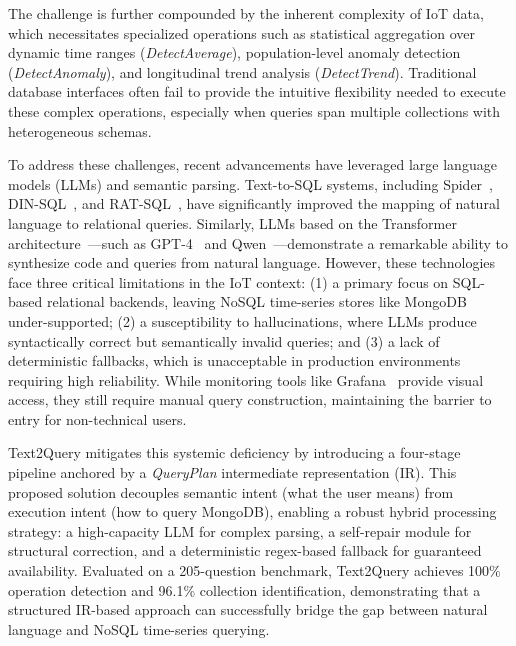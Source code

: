 \documentclass[preprint,12pt,a4paper]{elsarticle}
\begin{document}
The challenge is further compounded by the inherent complexity of IoT data, which necessitates specialized operations such as statistical aggregation over dynamic time ranges (\emph{DetectAverage}), population-level anomaly detection (\emph{DetectAnomaly}), and longitudinal trend analysis (\emph{DetectTrend}). Traditional database interfaces often fail to provide the intuitive flexibility needed to execute these complex operations, especially when queries span multiple collections with heterogeneous schemas.

To address these challenges, recent advancements have leveraged large language models (LLMs) and semantic parsing. Text-to-SQL systems, including Spider~\cite{yu2018spider}, DIN-SQL~\cite{pourreza2024dinsql}, and RAT-SQL~\cite{wang2020ratsql}, have significantly improved the mapping of natural language to relational queries. Similarly, LLMs based on the Transformer architecture~\cite{vaswani2017attention}---such as GPT-4~\cite{openai2023gpt4} and Qwen~\cite{bai2023qwen}---demonstrate a remarkable ability to synthesize code and queries from natural language. However, these technologies face three critical limitations in the IoT context: (1) a primary focus on SQL-based relational backends, leaving NoSQL time-series stores like MongoDB~\cite{mongodb} under-supported; (2) a susceptibility to hallucinations, where LLMs produce syntactically correct but semantically invalid queries; and (3) a lack of deterministic fallbacks, which is unacceptable in production environments requiring high reliability. While monitoring tools like Grafana~\cite{grafana} provide visual access, they still require manual query construction, maintaining the barrier to entry for non-technical users.

Text2Query mitigates this systemic deficiency by introducing a four-stage pipeline anchored by a \emph{QueryPlan} intermediate representation (IR). This proposed solution decouples semantic intent (what the user means) from execution intent (how to query MongoDB), enabling a robust hybrid processing strategy: a high-capacity LLM for complex parsing, a self-repair module for structural correction, and a deterministic regex-based fallback for guaranteed availability. Evaluated on a 205-question benchmark, Text2Query achieves 100\% operation detection and 96.1\% collection identification, demonstrating that a structured IR-based approach can successfully bridge the gap between natural language and NoSQL time-series querying.

\end{document}
